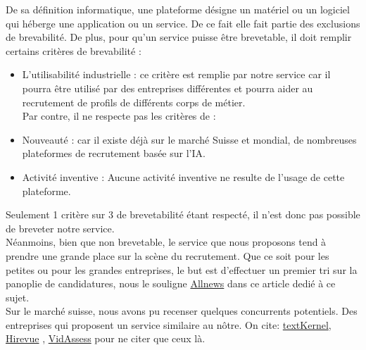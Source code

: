 De sa définition informatique, une plateforme désigne un matériel ou un logiciel qui héberge une application ou un service. De ce fait elle fait partie des exclusions de brevabilité. De plus, pour qu'un service puisse être brevetable, il doit remplir certains critères de brevabilité : 
 \begin{itemize}
     \item L'utilisabilité industrielle : ce critère est remplie par notre service car il pourra être utilisé par des entreprises différentes et pourra aider au recrutement de profils de différents corps de métier. \\
     Par contre, il ne respecte pas les critères de :
     \item Nouveauté : car il existe déjà sur le marché Suisse et mondial, de nombreuses plateformes de recrutement basée sur l'IA.
     \item Activité inventive : Aucune activité inventive ne resulte de l'usage de cette plateforme. 
 \end{itemize}
Seulement 1 critère sur 3 de brevetabilité étant respecté, il n'est donc pas possible de breveter notre service. \\
Néanmoins, bien que non brevetable, le service que nous proposons tend à prendre une grande place sur la scène du recrutement. Que ce soit pour les petites ou pour les grandes entreprises, le but est d'effectuer un premier tri sur la panoplie de candidatures, nous le souligne \href{https://www.allnews.ch/content/points-de-vue/intelligence-artificielle-et-recrutement}{Allnews} dans ce article dedié à ce sujet.  \\ 
 Sur le marché suisse, nous avons pu recenser quelques concurrents potentiels. Des entreprises qui proposent un service similaire au nôtre. On cite: \href{https://www.textkernel.com/fr/?utm_term=recrutement%20intelligence%20artificielle&utm_source=adwords&utm_campaign=FR+-+Search+-+Non+Brand&utm_medium=ppc&hsa_mt=p&hsa_src=g&hsa_kw=recrutement%20intelligence%20artificielle&hsa_ad=629928942899&hsa_tgt=kwd-541674329900&hsa_ver=3&hsa_acc=1393423699&hsa_net=adwords&hsa_cam=18670126951&hsa_grp=144320914202&gclid=CjwKCAiA5Y6eBhAbEiwA_2ZWISLyh3zdDh-KHgpPZ955DcROOiNeKEdHtwnNKpShXb0kbDMqB6jNvRoCTYwQAvD_BwE}{textKernel}, \href{https://www.hirevue.com/}{Hirevue} , \href{https://assessment.aon.com/en-us/video-interviewing-solution}{VidAssess} pour ne citer que ceux là. 

